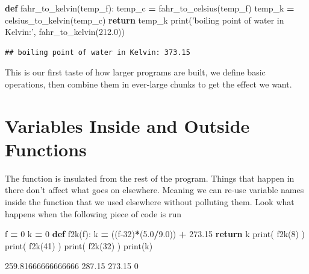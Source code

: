 \documentclass[]{book}
\newenvironment{Shaded}{\begin{snugshade}}{\end{snugshade}}
\newcommand{\BuiltInTok}[1]{#1}
\newcommand{\ControlFlowTok}[1]{\textcolor[rgb]{0.13,0.29,0.53}{\textbf{#1}}}
\newcommand{\DecValTok}[1]{\textcolor[rgb]{0.00,0.00,0.81}{#1}}
\newcommand{\FloatTok}[1]{\textcolor[rgb]{0.00,0.00,0.81}{#1}}
\newcommand{\KeywordTok}[1]{\textcolor[rgb]{0.13,0.29,0.53}{\textbf{#1}}}
\newcommand{\NormalTok}[1]{#1}
\newcommand{\OperatorTok}[1]{\textcolor[rgb]{0.81,0.36,0.00}{\textbf{#1}}}
\newcommand{\StringTok}[1]{\textcolor[rgb]{0.31,0.60,0.02}{#1}}
\theoremstyle{definition}
\theoremstyle{definition}
\theoremstyle{definition}
\theoremstyle{remark}
\begin{document}
\begin{Shaded}
\begin{Highlighting}[]
\KeywordTok{def}\NormalTok{ fahr_to_kelvin(temp_f):}
\NormalTok{    temp_c }\OperatorTok{=}\NormalTok{ fahr_to_celsius(temp_f)}
\NormalTok{    temp_k }\OperatorTok{=}\NormalTok{ celsius_to_kelvin(temp_c)}
    \ControlFlowTok{return}\NormalTok{ temp_k}
\BuiltInTok{print}\NormalTok{(}\StringTok{'boiling point of water in Kelvin:'}\NormalTok{, fahr_to_kelvin(}\FloatTok{212.0}\NormalTok{))}
\end{Highlighting}
\end{Shaded}

\begin{verbatim}
## boiling point of water in Kelvin: 373.15
\end{verbatim}

This is our first taste of how larger programs are built, we define
basic operations, then combine them in ever-large chunks to get the
effect we want.

\hypertarget{variables-inside-and-outside-functions}{%
\section{Variables Inside and Outside
Functions}\label{variables-inside-and-outside-functions}}

The function is insulated from the rest of the program. Things that
happen in there don't affect what goes on elsewhere. Meaning we can
re-use variable names inside the function that we used elsewhere without
polluting them. Look what happens when the following piece of code is
run

\begin{Shaded}
\begin{Highlighting}[]
\NormalTok{f }\OperatorTok{=} \DecValTok{0}
\NormalTok{k }\OperatorTok{=} \DecValTok{0}
\KeywordTok{def}\NormalTok{ f2k(f):}
\NormalTok{    k }\OperatorTok{=}\NormalTok{ ((f}\DecValTok{-32}\NormalTok{)}\OperatorTok{*}\NormalTok{(}\FloatTok{5.0}\OperatorTok{/}\FloatTok{9.0}\NormalTok{)) }\OperatorTok{+} \FloatTok{273.15}
    \ControlFlowTok{return}\NormalTok{ k}
\BuiltInTok{print}\NormalTok{( f2k(}\DecValTok{8}\NormalTok{) )}
\BuiltInTok{print}\NormalTok{( f2k(}\DecValTok{41}\NormalTok{) )}
\BuiltInTok{print}\NormalTok{( f2k(}\DecValTok{32}\NormalTok{) )}
\BuiltInTok{print}\NormalTok{(k)}
\end{Highlighting}
\end{Shaded}

\begin{Shaded}
\begin{Highlighting}[]
\FloatTok{259.81666666666666}
\FloatTok{287.15}
\FloatTok{273.15}
\DecValTok{0}
\end{Highlighting}
\end{Shaded}
\end{document}
